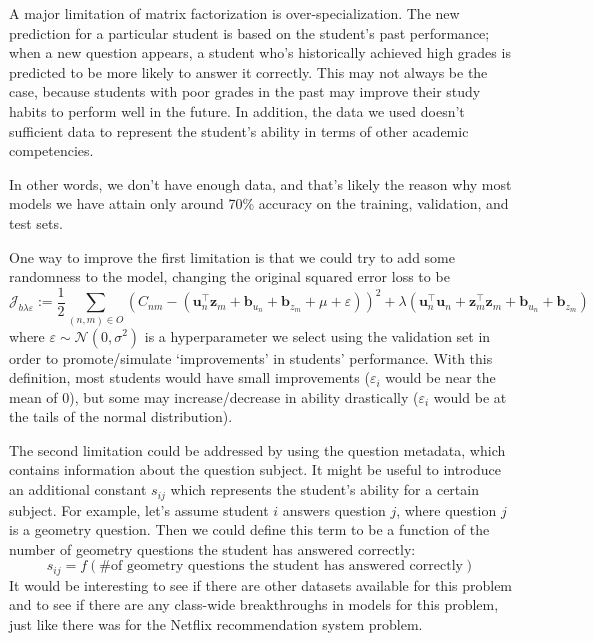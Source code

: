 \documentclass{article}
\newcommand{\mbf}[1]{\mathbf{#1}}
\begin{document}
\begin{enumerate}[label=\arabic*.]
        A major limitation of matrix factorization is over-specialization. The new prediction for a particular student is based on the student's past performance; when a new question appears, a student who's historically achieved high grades is predicted to be more likely to answer it correctly. This may not always be the case, because students with poor grades in the past may improve their study habits to perform well in the future. In addition, the data we used doesn't sufficient data to represent the student's ability in terms of other academic competencies.

        In other words, we don't have enough data, and that's likely the reason why most models we have attain only around 70\% accuracy on the training, validation, and test sets. 

        One way to improve the first limitation is that we could try to add some randomness to the model, changing the original squared error loss to be \[
            \mathcal{J}_{b\lambda\varepsilon} := \frac{1}{2}\sum_{(n, m)\in O}{\left(C_{nm}-\left(\mbf u_n^\top \mbf z_m+\mbf b_{u_n}+\mbf b_{z_m}+\mu+\varepsilon\right)\right)^2+\lambda \left(\mbf u_n^\top\mbf u_n+\mbf z_m^\top\mbf z_m+\mbf b_{u_n}+\mbf b_{z_m}\right)}
        \] 
        where $\varepsilon\sim \mathcal N(0,\sigma^2)$ is a hyperparameter we select using the validation set in order to promote/simulate `improvements' in students' performance. With this definition, most students would have small improvements ($\varepsilon_i$ would be near the mean of 0), but some may increase/decrease in ability drastically ($\varepsilon_i$ would be at the tails of the normal distribution).

        The second limitation could be addressed by using the question metadata, which contains information about the question subject. It might be useful to introduce an additional constant $s_{ij}$ which represents the student's ability for a certain subject. For example, let's assume student $i$ answers question $j$, where question $j$ is a geometry question. Then we could define this term to be a function of the number of geometry questions the student has answered correctly: \[
            s_{ij}=f(\text{\# of geometry questions the student has answered correctly})
        \]
        It would be interesting to see if there are other datasets available for this problem and to see if there are any class-wide breakthroughs in models for this problem, just like there was for the Netflix recommendation system problem. 
\end{enumerate}

\nocite{*}
\printbibliography[title={\section{References}}]
\end{document}
